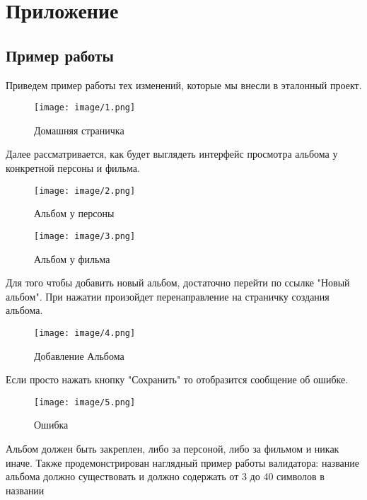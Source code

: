 \section{Приложение}
\vspace*{1cm}
\subsection{Пример работы}
\vspace*{1cm}
Приведем пример работы тех изменений, которые мы внесли в эталонный проект.\\
\begin{figure}[h!]
\begin{center}
\texttt{[image: image/1.png]}
\end{center}
\newpage
\caption{Домашняя страничка}
\end{figure}
\newpage
Далее рассматривается, как будет выглядеть интерфейс просмотра альбома у конкретной персоны и фильма.\\
\begin{figure}[h!]
\begin{center}
\texttt{[image: image/2.png]}
\end{center}
\caption{Альбом у персоны}
\end{figure}
\begin{figure}[h!]
\begin{center}
\texttt{[image: image/3.png]}
\end{center}
\caption{Альбом у фильма}
\end{figure}
\newpage
Для того чтобы добавить новый альбом, достаточно перейти по ссылке "Новый альбом". При нажатии произойдет перенаправление на страничку создания альбома.\\
\begin{figure}[h!]
\begin{center}
\texttt{[image: image/4.png]}
\end{center}
\caption{Добавление Альбома}
\end{figure}
\newpage
Если просто нажать кнопку "Сохранить" то отобразится сообщение об ошибке.\\
\begin{figure}[h!]
\begin{center}
\texttt{[image: image/5.png]}
\end{center}
\caption{Ошибка}
\end{figure}
Альбом должен быть закреплен, либо за персоной, либо за фильмом и никак иначе. Также продемонстрирован наглядный пример работы валидатора: название альбома должно существовать и должно содержать от 3 до 40 символов в названии
\newpage
\endinput
